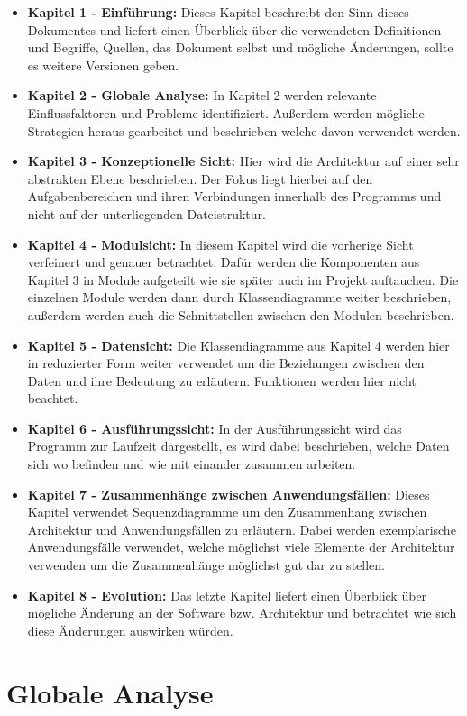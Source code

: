 \documentclass[fontsize=12pt,paper=a4,twoside]{scrartcl}
\begin{document}
\begin{itemize}
\item \textbf{Kapitel 1 - Einführung:} Dieses Kapitel beschreibt den Sinn dieses Dokumentes und liefert einen Überblick über die verwendeten Definitionen und Begriffe, Quellen, das Dokument selbst und mögliche Änderungen, sollte es weitere Versionen geben.
\item \textbf{Kapitel 2 - Globale Analyse:} In Kapitel 2 werden relevante Einflussfaktoren und Probleme identifiziert. Außerdem werden mögliche Strategien heraus gearbeitet und beschrieben welche davon verwendet werden.
\item \textbf{Kapitel 3 - Konzeptionelle Sicht:} Hier wird die Architektur auf einer sehr abstrakten Ebene beschrieben. Der Fokus liegt hierbei auf den Aufgabenbereichen und ihren Verbindungen innerhalb des Programms und nicht auf der unterliegenden Dateistruktur.
\item \textbf{Kapitel 4 - Modulsicht:} In diesem Kapitel wird die vorherige Sicht verfeinert und genauer betrachtet. Dafür werden die Komponenten aus Kapitel 3 in Module aufgeteilt wie sie später auch im Projekt auftauchen. Die einzelnen Module werden dann durch Klassendiagramme weiter beschrieben, außerdem werden auch die Schnittstellen zwischen den Modulen beschrieben.
\item \textbf{Kapitel 5 - Datensicht:} Die Klassendiagramme aus Kapitel 4 werden hier in reduzierter Form weiter verwendet um die Beziehungen zwischen den Daten und ihre Bedeutung zu erläutern. Funktionen werden hier nicht beachtet.
\item \textbf{Kapitel 6 - Ausführungssicht:} In der Ausführungssicht wird das Programm zur Laufzeit dargestellt, es wird dabei beschrieben, welche Daten sich wo befinden und wie mit einander zusammen arbeiten.
\item \textbf{Kapitel 7 - Zusammenhänge zwischen Anwendungsfällen:} Dieses Kapitel verwendet Sequenzdiagramme um den Zusammenhang zwischen Architektur und Anwendungsfällen zu erläutern. Dabei werden exemplarische Anwendungsfälle verwendet, welche möglichst viele Elemente der Architektur verwenden um die Zusammenhänge möglichst gut dar zu stellen.
\item \textbf{Kapitel 8 - Evolution:} Das letzte Kapitel liefert einen Überblick über mögliche Änderung an der Software bzw. Architektur und betrachtet wie sich diese Änderungen auswirken würden.
\end{itemize}

\section{Globale Analyse}
\label{sec:globale_analyse}
\end{document}
